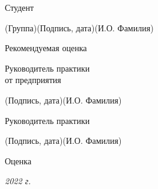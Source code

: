 \documentclass[14pt, russian]{scrartcl}
\begin{document}
\begin{titlepage}
\vspace{\fill}
 

\noindent Студент \underline{\hspace{1.5cm}} \hfill \underline{\hspace{4cm}}\quad
\underline{\hspace{4cm}}

\vspace{-2.1ex}
\noindent\hspace{9ex}\scriptsize{(Группа)}\normalsize\hspace{170pt}\hspace{2ex}\scriptsize{(Подпись, дата)}\normalsize\hspace{30pt}\hspace{6ex}\scriptsize{(И.О. Фамилия)}\normalsize

\bigskip

\noindent Рекомендуемая оценка\hfill\underline{\hspace{195pt}}\hfill

\bigskip

\noindent \parbox{0.333\textwidth}{Руководитель практики\\от предприятия}  
\hfill \underline{\hspace{4cm}}\quad \underline{\hspace{4cm}}

\vspace{-2ex}
\noindent\hspace{13.5ex}\normalsize\hspace{170pt}\hspace{2ex}\scriptsize{(Подпись, дата)}\normalsize\hspace{30pt}\hspace{6ex}\scriptsize{(И.О. Фамилия)}\normalsize


\bigskip

\noindent Руководитель практики  \hfill \underline{\hspace{4cm}}\quad
\underline{\hspace{4cm}}

\vspace{-2ex}
\noindent\hspace{13.5ex}\normalsize\hspace{170pt}\hspace{2ex}\scriptsize{(Подпись, дата)}\normalsize\hspace{30pt}\hspace{6ex}\scriptsize{(И.О. Фамилия)}\normalsize

\vspace{2ex}
\noindent Оценка\hfill\underline{\hspace{195pt}}

\vfill

 


\begin{center}
\textsl{2022 г.}
\end{center}
\end{titlepage}
\end{document}

